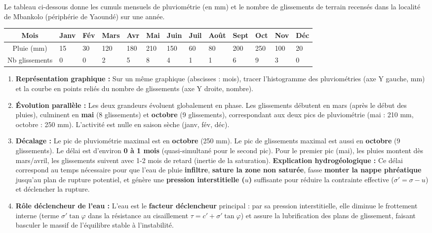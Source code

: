 \documentclass[11pt]{article}
\begin{document}
\begin{exercice}
Le tableau ci-dessous donne les cumuls mensuels de pluviométrie (en mm) et le nombre de glissements de terrain recensés dans la localité de Mbankolo (périphérie de Yaoundé) sur une année.

\begin{center}
\begin{tabularx}{\linewidth}{|c|*{12}{X|}}\hline
Mois & Janv & Fév & Mars & Avr & Mai & Juin & Juil & Août & Sept & Oct & Nov & Déc \\ \hline
Pluie (mm) & 15 & 30 & 120 & 180 & 210 & 150 & 60 & 80 & 200 & 250 & 100 & 20 \\ \hline
Nb glissements & 0 & 0 & 2 & 5 & 8 & 4 & 1 & 1 & 6 & 9 & 3 & 0 \\ \hline
\end{tabularx}
\end{center}

\begin{enumerate}
\item \textbf{Représentation graphique :} Sur un même graphique (abscisses : mois), tracer l'histogramme des pluviométries (axe Y gauche, mm) et la courbe en points reliés du nombre de glissements (axe Y droite, nombre).
\item \textbf{Évolution parallèle :} Les deux grandeurs évoluent globalement en phase. Les glissements débutent en mars (après le début des pluies), culminent en \textbf{mai} (8 glissements) et \textbf{octobre} (9 glissements), correspondant aux deux pics de pluviométrie (mai : 210 mm, octobre : 250 mm). L'activité est nulle en saison sèche (janv, fév, déc).
\item \textbf{Décalage :} Le pic de pluviométrie maximal est en \textbf{octobre} (250 mm). Le pic de glissements maximal est aussi en \textbf{octobre} (9 glissements). Le délai est d'environ \textbf{0 à 1 mois} (quasi-simultané pour le second pic). Pour le premier pic (mai), les pluies montent dès mars/avril, les glissements suivent avec 1-2 mois de retard (inertie de la saturation). \textbf{Explication hydrogéologique :} Ce délai correspond au temps nécessaire pour que l'eau de pluie \textbf{infiltre}, \textbf{sature la zone non saturée}, fasse \textbf{monter la nappe phréatique} jusqu'au plan de rupture potentiel, et génère une \textbf{pression interstitielle ($u$)} suffisante pour réduire la contrainte effective ($\sigma' = \sigma - u$) et déclencher la rupture.
\item \textbf{Rôle déclencheur de l'eau :} L'eau est le \textbf{facteur déclencheur} principal : par sa pression interstitielle, elle diminue le frottement interne (terme $\sigma' \tan\varphi$ dans la résistance au cisaillement $\tau = c' + \sigma' \tan\varphi$) et assure la lubrification des plans de glissement, faisant basculer le massif de l'équilibre stable à l'instabilité.
\end{enumerate}
\end{exercice}
\end{document}
